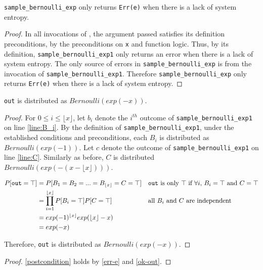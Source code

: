 \documentclass{article}
\begin{document}
\begin{lemma}
    \label{err-e}
    \texttt{sample\_bernoulli\_exp} only returns \texttt{Err(e)} when there is a lack of system entropy.
\end{lemma}

\begin{proof}
    In all invocations of , the argument passed satisfies its definition preconditions, 
    by the preconditions on \texttt{x} and function logic.
    Thus, by its definition, \texttt{sample\_bernoulli\_exp1} only returns an error when there is a lack of system entropy.
    The only source of errors in \texttt{sample\_bernoulli\_exp} is from the invocation of \texttt{sample\_bernoulli\_exp1}.
    Therefore \texttt{sample\_bernoulli\_exp} only returns \texttt{Err(e)} when there is a lack of system entropy.
\end{proof}

\begin{lemma}
    \label{ok-out}
    \texttt{out} is distributed as $Bernoulli(exp(-x))$.
\end{lemma}

\begin{proof}
    For $0 \le i \le \lfloor x \rfloor$, let $b_i$ denote the $i^{th}$ outcome of \texttt{sample\_bernoulli\_exp1} on line \ref{line:B_i}.
    By the definition of \texttt{sample\_bernoulli\_exp1}, under the established conditions and preconditions,
    each $B_i$ is distributed as $Bernoulli(exp(-1))$.
    Let $c$ denote the outcome of \texttt{sample\_bernoulli\_exp1} on line \ref{line:C}. 
    Similarly as before, $C$ is distributed $Bernoulli(exp(-(x - \lfloor x \rfloor)))$.

    \begin{align*}
        P[\texttt{out} = \top] &= P[B_1 = B_2 = ... = B_{\lfloor x \rfloor} = C = \top] && \text{\texttt{out} is only $\top$ if $\forall i$, $B_i = \top$ and $C = \top$} \\
        &= \prod_{i=1}^{\lfloor x \rfloor} P[B_i = \top] P[C = \top] && \text{all $B_i$ and $C$ are independent} \\
        &= exp(-1)^{\lfloor x \rfloor} exp(\lfloor x \rfloor - x) \\
        &= exp(-x)
    \end{align*}

    Therefore, \texttt{out} is distributed as $Bernoulli(exp(-x))$.
\end{proof}


\begin{proof}
    \ref{postcondition} holds by \ref{err-e} and \ref{ok-out}.
\end{proof}



\end{document}

